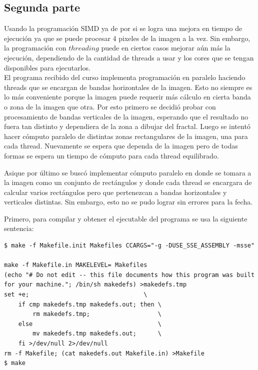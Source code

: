 \documentclass[a4paper,10pt]{article}
\begin{document}
\subsection{Segunda parte}
Usando la programación SIMD ya de por si se logra una mejora en tiempo de ejecución ya que se puede procesar 4 pixeles de la imagen a la vez. Sin embargo, la programación con $threading$ puede en ciertos casos mejorar aún más la ejecución, dependiendo de la cantidad de threads a usar y los cores que se tengan disponibles para ejecutarlos.\\
El programa recibido del curso implementa programación en paralelo haciendo threads que se encargan de bandas horizontales de la imagen. Esto no siempre es lo más conveniente porque la imagen puede requerir más cálculo en cierta banda o zona de la imagen que otra.
Por esto primero se decidió probar con procesamiento de bandas verticales de la imagen, esperando que el resultado no fuera tan distinto y dependiera de la zona a dibujar del fractal.
Luego se intentó hacer cómputo paralelo de distintas zonas rectangulares de la imagen, una para cada thread. Nuevamente se espera que dependa de la imagen pero de todas formas se espera un tiempo de cómputo para cada thread equilibrado.

Asique por último se buscó implementar cómputo paralelo en donde se tomara a la imagen como un conjunto de rectángulos y donde cada thread se encargara de calcular varios rectángulos pero que pertenezcan a bandas horizontales y verticales distintas. Sin embargo, esto no se pudo lograr sin errores para la fecha.


Primero, para compilar y obtener el ejecutable del programa se usa la siguiente sentencia:
\begin{verbatim}
$ make -f Makefile.init Makefiles CCARGS="-g -DUSE_SSE_ASSEMBLY -msse"

make -f Makefile.in MAKELEVEL= Makefiles
(echo "# Do not edit -- this file documents how this program was built for your machine."; /bin/sh makedefs) >makedefs.tmp
set +e;                                \
	if cmp makedefs.tmp makedefs.out; then \
	    rm makedefs.tmp;                   \
	else                                   \
	    mv makedefs.tmp makedefs.out;      \
	fi >/dev/null 2>/dev/null
rm -f Makefile; (cat makedefs.out Makefile.in) >Makefile
$ make
\end{verbatim}
\end{document}
